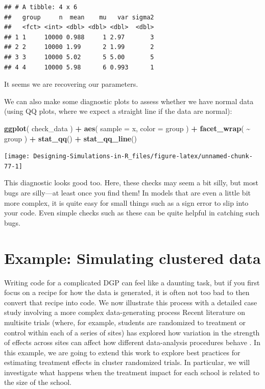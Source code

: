 \documentclass[
]{book}
\newenvironment{Shaded}{\begin{snugshade}}{\end{snugshade}}
\newcommand{\AttributeTok}[1]{\textcolor[rgb]{0.13,0.29,0.53}{#1}}
\newcommand{\FunctionTok}[1]{\textcolor[rgb]{0.13,0.29,0.53}{\textbf{#1}}}
\newcommand{\NormalTok}[1]{#1}
\newcommand{\SpecialCharTok}[1]{\textcolor[rgb]{0.81,0.36,0.00}{\textbf{#1}}}
\begin{document}
\begin{verbatim}
## # A tibble: 4 x 6
##   group     n  mean    mu   var sigma2
##   <fct> <int> <dbl> <dbl> <dbl>  <dbl>
## 1 1     10000 0.988     1 2.97       3
## 2 2     10000 1.99      2 1.99       2
## 3 3     10000 5.02      5 5.00       5
## 4 4     10000 5.98      6 0.993      1
\end{verbatim}

It seems we are recovering our parameters.

We can also make some diagnostic plots to assess whether we have normal data (using QQ plots, where we expect a straight line if the data are normal):

\begin{Shaded}
\begin{Highlighting}[]
\FunctionTok{ggplot}\NormalTok{( check\_data ) }\SpecialCharTok{+}
  \FunctionTok{aes}\NormalTok{( }\AttributeTok{sample =}\NormalTok{ x, }\AttributeTok{color =}\NormalTok{ group ) }\SpecialCharTok{+} 
  \FunctionTok{facet\_wrap}\NormalTok{( }\SpecialCharTok{\textasciitilde{}}\NormalTok{ group ) }\SpecialCharTok{+}
  \FunctionTok{stat\_qq}\NormalTok{() }\SpecialCharTok{+} \FunctionTok{stat\_qq\_line}\NormalTok{()}
\end{Highlighting}
\end{Shaded}

\begin{center}\texttt{[image: Designing-Simulations-in-R\_files/figure-latex/unnamed-chunk-77-1]} \end{center}

This diagnostic looks good too.
Here, these checks may seem a bit silly, but most bugs are silly---at least once you find them!
In models that are even a little bit more complex, it is quite easy for small things such as a sign error to slip into your code.
Even simple checks such as these can be quite helpful in catching such bugs.

\section{Example: Simulating clustered data}\label{case-cluster}

Writing code for a complicated DGP can feel like a daunting task, but if you first focus on a recipe for how the data is generated, it is often not too bad to then convert that recipe into code.
We now illustrate this process with a detailed case study involving a more complex data-generating process
Recent literature on multisite trials (where, for example, students are randomized to treatment or control within each of a series of sites) has explored how variation in the strength of effects across sites can affect how different data-analysis procedures behave \citep[e.g.,][]{miratrix2021applied, Bloom2016using}.
In this example, we are going to extend this work to explore best practices for estimating treatment effects in cluster randomized trials.
In particular, we will investigate what happens when the treatment impact for each school is related to the size of the school.
\end{document}
